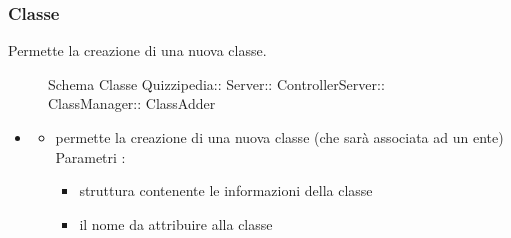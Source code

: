 \subsubsection{Classe }
Permette la creazione di una nuova classe.
\begin{figure}[H]
\centering
\noindent{}
\caption[Schema Classe ClassAdder]{Schema Classe Quizzipedia:: Server:: ControllerServer:: ClassManager:: ClassAdder}
\end{figure}
\begin{itemize}
\item {}
\begin{itemize}
\item {}
\newline
permette la creazione di una nuova classe (che sarà associata ad un ente)
\newline
Parametri :
\begin{itemize}
\item {}
\newline
struttura contenente le informazioni della classe
\item {}
\newline
il nome da attribuire alla classe
\end{itemize}
\end{itemize}
\end{itemize}
